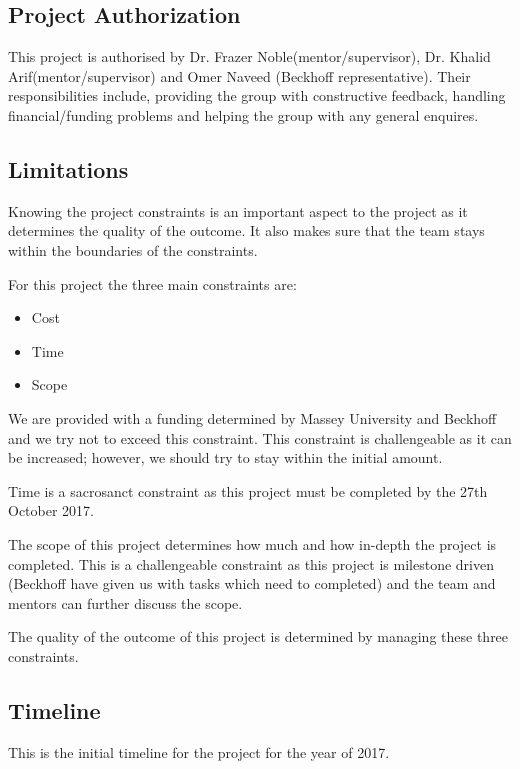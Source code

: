 \documentclass[a4paper, 10pt, conference]{IEEEconf}
\begin{document}
\subsection{Project Authorization}
This project is authorised by Dr. Frazer Noble(mentor/supervisor), Dr. Khalid Arif(mentor/supervisor) and Omer Naveed (Beckhoff representative). Their responsibilities include, providing the group with constructive feedback, handling financial/funding problems and helping the group with any general enquires. 

\subsection{Limitations}
Knowing the project constraints is an important aspect to the project as it determines the quality of the outcome. It also makes sure that the team stays within the boundaries of the constraints.

For this project the three main constraints are:
\begin{itemize}
	\item Cost
	\item Time
	\item Scope
\end{itemize}	

We are provided with a funding determined by Massey University and Beckhoff and we try not to exceed this constraint. This constraint is challengeable as it can be increased; however, we should try to stay within the initial amount.

Time is a sacrosanct constraint as this project must be completed by the 27th October 2017.

The scope of this project determines how much and how in-depth the project is completed. This is a challengeable constraint as this project is milestone driven (Beckhoff have given us with tasks which need to completed) and the team and mentors can further discuss the scope.

The quality of the outcome of this project is determined by managing these three constraints.

\subsection{Timeline}
This is the initial timeline for the project for the year of 2017.
\end{document}

